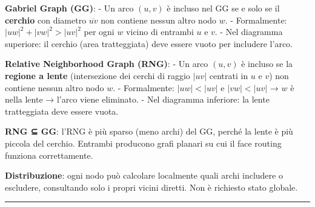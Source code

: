 \documentclass[
  italian,
  openany]{book}
\begin{document}
\textbf{Gabriel Graph (GG)}: - Un arco \((u, v)\) è incluso nel GG se e
solo se il \textbf{cerchio} con diametro \(\overline{uv}\) non contiene
nessun altro nodo \(w\). - Formalmente: \(|uw|^2 + |vw|^2 > |uv|^2\) per
ogni \(w\) vicino di entrambi \(u\) e \(v\). - Nel diagramma superiore:
il cerchio (area tratteggiata) deve essere vuoto per includere l'arco.

\textbf{Relative Neighborhood Graph (RNG)}: - Un arco \((u, v)\) è
incluso se la \textbf{regione a lente} (intersezione dei cerchi di
raggio \(|uv|\) centrati in \(u\) e \(v\)) non contiene nessun altro
nodo \(w\). - Formalmente: \(|uw| < |uv|\) e \(|vw| < |uv|\) → \(w\) è
nella lente → l'arco viene eliminato. - Nel diagramma inferiore: la
lente tratteggiata deve essere vuota.

\textbf{RNG ⊆ GG}: l'RNG è più sparso (meno archi) del GG, perché la
lente è più piccola del cerchio. Entrambi producono grafi planari su cui
il face routing funziona correttamente.

\textbf{Distribuzione}: ogni nodo può calcolare localmente quali archi
includere o escludere, consultando solo i propri vicini diretti. Non è
richiesto stato globale.

\begin{center}\rule{0.5\linewidth}{0.5pt}\end{center}
\end{document}
